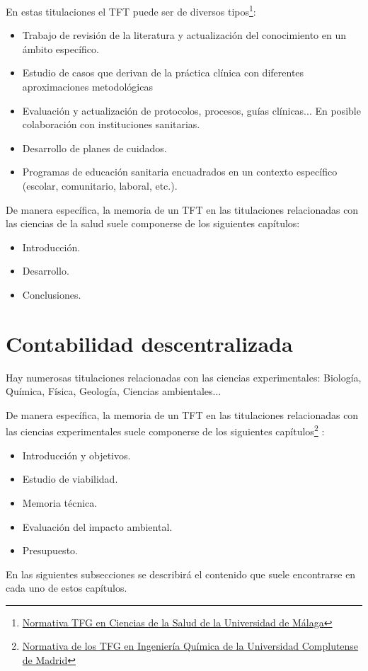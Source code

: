 \documentclass[12pt,spanish,chapterprefix, numbers=noenddot]{book}
\numberwithin{equation}{section}
\numberwithin{figure}{section}
\begin{document}
    En estas titulaciones el TFT puede ser de diversos tipos\footnote{\href{https://www.uma.es/media/files/Normativa_TFG_10_11_17.pdf}{Normativa TFG en Ciencias de la Salud de la Universidad de Málaga}}:
    \begin{itemize}
        \item Trabajo de revisión de la literatura y actualización del conocimiento
        en un ámbito específico.
        \item Estudio de casos que derivan de la práctica clínica con diferentes
        aproximaciones metodológicas
        \item Evaluación y actualización de protocolos, procesos, guías clínicas...
        En posible colaboración con instituciones sanitarias.
        \item Desarrollo de planes de cuidados.
        \item Programas de educación sanitaria encuadrados en un contexto específico
        (escolar, comunitario, laboral, etc.).
    \end{itemize}
    De manera específica, la memoria de un TFT en las titulaciones relacionadas
    con las ciencias de la salud suele componerse de los siguientes capítulos:
    \begin{itemize}
        \item Introducción.
        \item Desarrollo.
        \item Conclusiones.
    \end{itemize}

    \section{Contabilidad descentralizada}

    Hay numerosas titulaciones relacionadas con las ciencias experimentales:
    Biología, Química, Física, Geología, Ciencias ambientales...

    De manera específica, la memoria de un TFT en las titulaciones relacionadas
    con las ciencias experimentales suele componerse de los siguientes
    capítulos\footnote{\href{https://www.ucm.es/data/cont/docs/98-2013-10-17-Anexo\%206\%20-\%20Normas\%20generales\%20para\%20la\%20redacci\%C3\%B3n\%20memoria\%20TFG-IQ.pdf}{Normativa de los TFG en Ingeniería Química de la Universidad Complutense de Madrid}}
    :
    \begin{itemize}
        \item Introducción y objetivos.
        \item Estudio de viabilidad.
        \item Memoria técnica.
        \item Evaluación del impacto ambiental.
        \item Presupuesto.
    \end{itemize}
    En las siguientes subsecciones se describirá el contenido que suele
    encontrarse en cada uno de estos capítulos.
\end{document}
